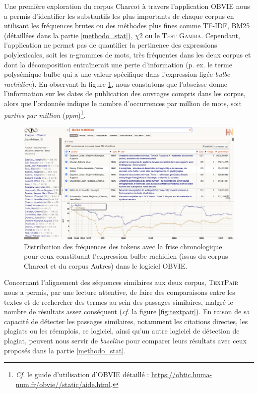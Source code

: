 Une première exploration du corpus Charcot à travers l'application OBVIE nous a permis d'identifier les substantifs les plus importants de chaque corpus en utilisant les fréquences brutes ou des méthodes plus fines comme \textsc{TF-IDF}, \textsc{BM25} (détaillées dans la partie \ref{methodo_stat}), \textsc{$\chi$2} ou le \textsc{Test Gamma}. Cependant, l'application ne permet pas de quantifier la pertinence des expressions polylexicales, soit les n-grammes de mots, très fréquentes dans les deux corpus et dont la décomposition entraînerait une perte d'information (p. ex. le terme polysémique \og{}bulbe\fg{} qui a une valeur spécifique dans l'expression figée \textit{bulbe rachidien}). En observant la figure \ref{fig:bulbe}, nous constatons que l'abscisse donne l'information sur les dates de publication des ouvrages compris dans les corpus, alors que l'ordonnée indique le nombre d'occurrences par million de mots, soit \textit{parties par million} (\textit{ppm})\footnote{\textit{Cf.} le guide d'utilisation d'\textsc{OBVIE} détaillé : \url{https://obtic.huma-num.fr/obvie//static/aide.html}.}. 
\begin{figure}[!ht]
    \centering
    \includegraphics[width=1\textwidth]{img/bulbe_rachidien_mini.png}
    \caption{Distribution des fréquences des tokens avec la frise chronologique pour ceux constituant l'expression \og{}bulbe rachidien\fg{} (issus du corpus \og{}Charcot\fg{} et du corpus \og{}Autres\fg{}) dans le logiciel OBVIE.
    }
    \label{fig:bulbe}
\end{figure}

Concernant l'alignement des séquences similaires aux deux corpus, \textsc{TextPair} nous a permis, par une lecture attentive, de faire des comparaisons entre les textes et de rechercher des termes au sein des passages similaires, malgré le nombre de résultats assez conséquent (\textit{cf}. la figure \ref{fig:textpair}). En raison de sa capacité de détecter les passages similaires, notamment les citations directes, les plagiats ou les réemplois, ce logiciel, ainsi qu'un autre logiciel de détection de plagiat, peuvent nous servir de \textit{baseline} pour comparer leurs résultats avec ceux proposés dans la partie \ref{methodo_stat}.

